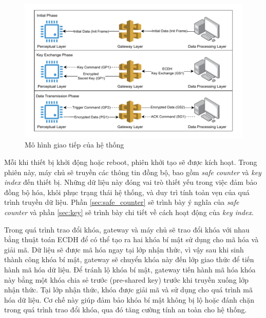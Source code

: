 \begin{figure}[h]
    \centering
    \includegraphics[width=0.85\linewidth]{images/system.pdf}
    \caption{Mô hình giao tiếp của hệ thống}
    \label{fig:system}
\end{figure}

Mỗi khi thiết bị khởi động hoặc reboot, phiên khởi tạo sẽ được kích hoạt. Trong phiên này, máy chủ sẽ truyền các thông tin đồng bộ, bao gồm \textit{safe counter} và \textit{key index} đến thiết bị. Những dữ liệu này đóng vai trò thiết yếu trong việc đảm bảo đồng bộ hóa, khôi phục trạng thái hệ thống, và duy trì tính toàn vẹn của quá trình truyền dữ liệu. Phần \ref{sec:safe_counter} sẽ trình bày ý nghĩa của \textit{safe counter} và phần \ref{sec:key} sẽ trình bày chi tiết về cách hoạt động của \textit{key index}.

Trong quá trình trao đổi khóa, gateway và máy chủ sẽ trao đổi khóa với nhau bằng thuật toán ECDH để có thể tạo ra hai khóa bí mật sử dụng cho mã hóa và giải mã. Dữ liệu sẽ được mã hóa ngay tại lớp nhận thức, vì vậy sau khi sinh thành công khóa bí mật, gateway sẽ chuyển khóa này đến lớp giao thức để tiến hành mã hóa dữ liệu. Để tránh lộ khóa bí mật, gateway tiến hành mã hóa khóa này bằng một khóa chia sẻ trước (pre-shared key) trước khi truyền xuống lớp nhận thức. Tại lớp nhận thức, khóa được giải mã và sử dụng cho quá trình mã hóa dữ liệu. Cơ chế này giúp đảm bảo khóa bí mật không bị lộ hoặc đánh chặn trong quá trình trao đổi khóa, qua đó tăng cường tính an toàn cho hệ thống.

